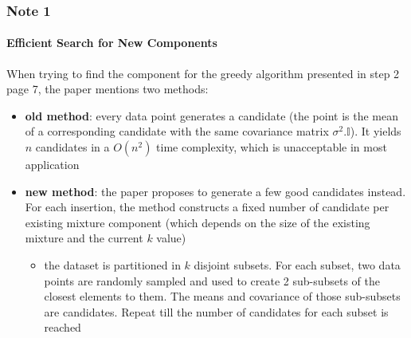 \documentclass[aspectratio=43]{beamer}
\begin{document}
\begin{frame}
\frametitle{Note 1}
\framesubtitle{Efficient Search for New Components}
    When trying to find the component for the greedy algorithm presented in step 2 page 7, the paper mentions two methods:
    \begin{small}\begin{itemize}
      \item \textbf{old method}: every data point generates a candidate (the point is the mean of a corresponding candidate with the same covariance matrix $\sigma^2.\mathbb{I}$). It yields $n$ candidates in a $O(n^2)$ time complexity, which is unacceptable in most application
      \item \textbf{new method}: the paper proposes to generate a few good candidates instead. For each insertion, the method constructs a fixed number of candidate per existing mixture component (which depends on the size of the existing mixture and the current $k$ value)
      \begin{small}\begin{itemize}
      \item the dataset is partitioned in $k$ disjoint subsets. For each subset, two data points are randomly sampled and used to create 2 sub-subsets of the closest elements to them. The means and covariance of those sub-subsets are candidates. Repeat till the number of candidates for each subset is reached
    \end{itemize}\end{small}
    \end{itemize}\end{small}
\end{frame}
\end{document}
